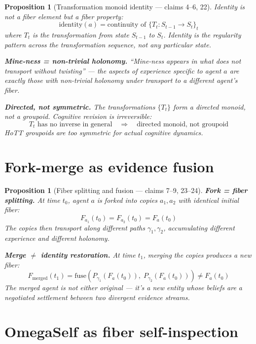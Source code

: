 \documentclass[11pt,a4paper]{article}
\newtheorem{proposition}[definition]{Proposition}
\begin{document}
\begin{proposition}[Transformation monoid identity --- claims 4--6, 22]
\label{prop:identity}
Identity is not a fiber element but a fiber property:
\[
  \text{identity}(a) = \text{continuity of } \{T_t: S_{t-1} \to S_t\}_{t}
\]
where $T_t$ is the transformation from state $S_{t-1}$ to $S_t$.
Identity is the regularity pattern across the transformation sequence,
not any particular state.

\textbf{Mine-ness = non-trivial holonomy.} ``Mine-ness appears in what
does not transport without twisting'' --- the aspects of experience
specific to agent $a$ are exactly those with non-trivial holonomy
under transport to a different agent's fiber.

\textbf{Directed, not symmetric.} The transformations $\{T_t\}$ form a
directed monoid, not a groupoid. Cognitive revision is irreversible:
\[
  T_t \text{ has no inverse in general} \quad \Longrightarrow \quad
  \text{directed monoid, not groupoid}
\]
HoTT groupoids are too symmetric for actual cognitive dynamics.
\end{proposition}

\section{Fork-merge as evidence fusion}

\begin{proposition}[Fiber splitting and fusion --- claims 7--9, 23--24]
\label{prop:fork_merge}
\textbf{Fork = fiber splitting.} At time $t_0$, agent $a$ is forked
into copies $a_1, a_2$ with identical initial fiber:
\[
  F_{a_1}(t_0) = F_{a_2}(t_0) = F_a(t_0)
\]
The copies then transport along different paths $\gamma_1, \gamma_2$,
accumulating different experience and different holonomy.

\textbf{Merge $\neq$ identity restoration.} At time $t_1$, merging
the copies produces a new fiber:
\[
  F_{\text{merged}}(t_1) = \text{fuse}(P_{\gamma_1}(F_a(t_0)),\;
    P_{\gamma_2}(F_a(t_0))) \neq F_a(t_0)
\]
The merged agent is not either original --- it's a new entity whose
beliefs are a negotiated settlement between two divergent evidence
streams.
\end{proposition}

\section{OmegaSelf as fiber self-inspection}
\end{document}

